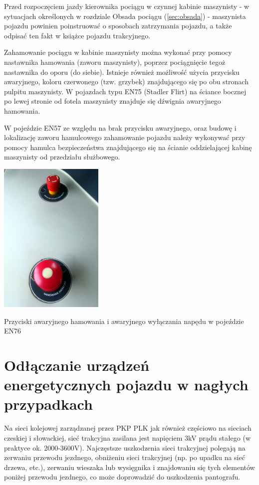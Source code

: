 Przed rozpoczęciem jazdy kierownika pociągu w czynnej kabinie maszynisty - w sytuacjach określonych w rozdziale Obsada pociągu (\ref{sec:obsada}) - maszynista pojazdu powinien poinstruować o sposobach zatrzymania pojazdu, a także odpisać ten fakt w książce pojazdu trakcyjnego.

Zahamowanie pociągu w kabinie maszynisty można wykonać przy pomocy nastawnika hamowania (zaworu maszynisty), poprzez pociągnięcie tegoż nastawnika do oporu (do siebie). Istnieje również możliwość użycia przycisku awaryjnego, koloru czerwonego (tzw. grzybek) znajdującego się po obu stronach pulpitu maszynisty. W pojazdach typu EN75 (Stadler Flirt) na ściance bocznej po lewej stronie od fotela maszynisty znajduje się dźwignia awaryjnego hamowania. 

W pojeździe EN57 ze względu na brak przycisku awaryjnego, oraz budowę i lokalizację zaworu hamulcowego zahamowanie pojazdu należy wykonywać przy pomocy hamulca bezpieczeństwa znajdującego się na ścianie oddzielającej kabinę maszynisty od przedziału służbowego.
\begin{marginfigure}
	\includegraphics[width=5cm]{skryptkierownik-img/grzybek.jpg}
	\caption{Przyciski awaryjnego hamowania i awaryjnego wyłączania napędu w pojeździe EN76}
\end{marginfigure}


\chapter{Odłączanie urządzeń energetycznych pojazdu w nagłych przypadkach}

Na sieci kolejowej zarządzanej przez PKP PLK jak również częściowo na sieciach czeskiej i słowackiej, sieć trakcyjna zasilana jest napięciem 3kV prądu stałego (w praktyce ok. 2000-3600V). Najczęstsze uszkodzenia sieci trakcyjnej polegają na zerwaniu przewodu jezdnego, obniżeniu sieci trakcyjnej (np. po upadku na sieć drzewa, etc.), zerwaniu wieszaka lub wysięgnika i znajdowaniu się tych elementów poniżej przewodu jezdnego, co może doprowadzić do uszkodzenia pantografu.


